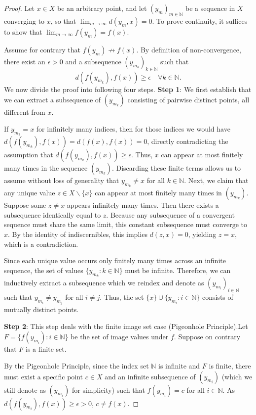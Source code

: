 \documentclass[a4paper,12pt,oneside]{article}
\numberwithin{equation}{section}
\begin{document}
\begin{proof}
Let $x\in X$ be an arbitrary point, and let $(y_{m})_{m\in \mathbb{N}}$ be a sequence in $X$ converging to $x$, so that $\lim_{m\to \infty}d(y_{m},x) = 0$. To prove continuity, it suffices to show that $\lim_{m\to \infty}f(y_{m}) = f(x)$.

Assume for contrary that $f(y_{m})\not\to f(x)$. By definition of non-convergence, there exist an $\epsilon >0$ and a subsequence $(y_{m_k})_{k\in \mathbb{N}}$ such that
\[
d(f(y_{m_k}),f(x))\geq \epsilon \quad \forall k\in \mathbb{N}.
\]
We now divide the proof into following four steps.\newline
\textbf{Step 1}:  We first establish that we can extract a subsequence of $(y_{m_k})$ consisting of pairwise distinct points, all different from $x$.

If $y_{m_k} = x$ for infinitely many indices, then for those indices we would have $d(f(y_{m_k}),f(x)) = d(f(x),f(x)) = 0$, directly contradicting the assumption that $d(f(y_{m_k}),f(x))\geq \epsilon$. Thus, $x$ can appear at most finitely many times in the sequence $(y_{m_k})$. Discarding these finite terms allows us to assume without loss of generality that $y_{m_k}\neq x$ for all $k\in \mathbb{N}$. Next, we claim that any unique value $z\in X\backslash \{x\}$ can appear at most finitely many times in $(y_{m_k})$. Suppose some $z\neq x$ appears infinitely many times. Then there exists a subsequence identically equal to $z$. Because any subsequence of a convergent sequence must share the same limit, this constant subsequence must converge to $x$. By the identity of indiscernibles, this implies $d(z,x) = 0$, yielding $z = x$, which is a contradiction.

Since each unique value occurs only finitely many times across an infinite sequence, the set of values $\{y_{m_k}:k\in \mathbb{N}\}$ must be infinite. Therefore, we can inductively extract a subsequence which we reindex and denote as $(y_{m_i})_{i\in \mathbb{N}}$ such that $y_{m_i}\neq y_{m_j}$ for all $i\neq j$. Thus, the set $\{x\} \cup \{y_{m_i}:i\in \mathbb{N}\}$ consists of mutually distinct points.

\textbf{Step 2}: This step deals with the finite image set case (Pigeonhole Principle).\newline Let $F = \{f(y_{m_i}):i\in \mathbb{N}\}$ be the set of image values under $f$. Suppose on contrary that $F$ is a finite set.

By the Pigeonhole Principle, since the index set $\mathbb{N}$ is infinite and $F$ is finite, there must exist a specific point $c\in X$ and an infinite subsequence of $(y_{m_i})$ (which we still denote as $(y_{m_i})$ for simplicity) such that $f(y_{m_i}) = c$ for all $i\in \mathbb{N}$. As $d(f(y_{m_i}),f(x))\geq \epsilon >0$, $c\neq f(x)$.


\end{proof}
\end{document}
